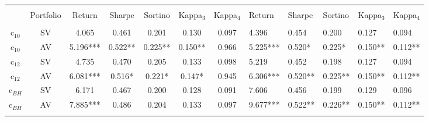 \begin{tabular}{@{\extracolsep{5pt}} cccccccHHHHH} 
\hline \\[-1.8ex] 
& Portfolio & Return & Sharpe & Sortino & Kappa$_{3}$ & Kappa$_{4}$ & Return & Sharpe & Sortino & Kappa$_{3}$ & Kappa$_{4}$ \\ 
\hline \\[-1.8ex] 
c$_{10}$ & SV & 4.065 & 0.461 & 0.201 & 0.130 & 0.097 & 4.396 & 0.454 & 0.200 & 0.127 & 0.094 \\ 
c$_{10}$ & AV & 5.196*** & 0.522** & 0.225** & 0.150** & 0.966 & 5.225*** & 0.520* & 0.225* & 0.150** & 0.112** \\ 
c$_{12}$ & SV & 4.735 & 0.470 & 0.205 & 0.133 & 0.098 & 5.219 & 0.452 & 0.198 & 0.127 & 0.094 \\ 
c$_{12}$ & AV & 6.081*** & 0.516* & 0.221* & 0.147* & 0.945 & 6.306*** & 0.520** & 0.225** & 0.150** & 0.112** \\ 
c$_{BH}$ & SV & 6.171 & 0.467 & 0.200 & 0.128 & 0.091 & 7.606 & 0.456 & 0.199 & 0.129 & 0.096 \\ 
c$_{BH}$ & AV & 7.885*** & 0.486 & 0.204 & 0.133 & 0.097 & 9.677*** & 0.522** & 0.226** & 0.150** & 0.112** \\ 
\hline\\[-1.8ex]
\end{tabular}